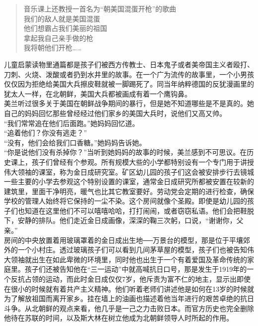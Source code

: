 \begin{quote}
	音乐课上还教授一首名为“朝美国混蛋开枪”的歌曲\\

	我们的敌人就是美国混蛋\\

	他们想霸占我们美丽的祖国\\

	拿起我自己亲手做的枪\\

	我将朝他们开枪……\\
\end{quote}

儿童启蒙读物里通篇都是孩子们被西方传教士、日本鬼子或者美帝国主义者殴打、刀刺、火烧、泼酸或者扔到水井里的故事。在一个广为流传的故事里，一个小男孩仅仅因为拒绝给美国大兵擦皮鞋就被一脚踢死了。同当年纳粹德国的反犹漫画里的犹太人一样，在北朝鲜，美国大兵都被画成有着一个鹰钩鼻。\\

美兰听过很多关于美国在朝鲜战争期间的暴行，但是她不知道哪些是不是真的。她自己的妈妈回忆那些曾经经过他们家乡的美国大兵时，说他们又高又帅。\\

“我们常常追在他们后面跑。”她妈妈回忆道。\\

“追着他们？你没有逃走？”\\

“没有，他们会给我们口香糖。”她妈妈告诉她。\\

“你是说他们没有杀掉你？”当听到她妈妈的故事的时候，美兰感到不可思议。在历史课上，孩子们曾经有个参观。所有规模大些的小学都特别设有一个专门用于讲授伟大领袖的课室，称为金日成研究室。矿区幼儿园的孩子们这会被安排步行去镜城一些主要的小学去参观这个特别设置的课室，通常金日成研究所都被安置在较新的建筑里，里面干净明亮，暖气也比其它教室要好。劳动党会定期的进行检查，确保学校的管理人始终将它保持的一尘不染。这个房间就像个圣殿。即使是幼儿园的孩子们也知道在这里他们不可以嘻嘻哈哈，打打闹闹，或者窃窃私语。他们会把鞋脱下，安静的排队。他们走近金日成画像，深深的鞠三次躬，口说，“谢谢你，父亲。”\\

房间的中央放置着用玻璃罩着的金日成出生地──万景台的模型，那是位于平壤郊外的一个小村庄。透过玻璃孩子们可以看到几间茅草屋的模型，孩子们也被告知伟大领袖就出生在如此卑微的环境里，同时他也出生于一个有着爱国及革命传统的家庭里。孩子们还被告知他在“三一运动”中就高喊抗日口号，那是发生于1919年的一个反抗占领的运动，而此时金日成仅仅7岁，他斥责为富不仁的地主，显示出即使在很小的时候就有着共产主义精神。他们听着老师们讲述他是如何在13岁的时候就为了解放祖国而离开家乡。挂在墙上的油画也描述着他当年进行的艰苦卓绝的抗日斗争。从北朝鲜的观点来看，他几乎是一己之力击败日本。而官方历史也完全删除他待在苏联的时间，以及斯大林在树立他成为北朝鲜领导人时所起的作用。\\


